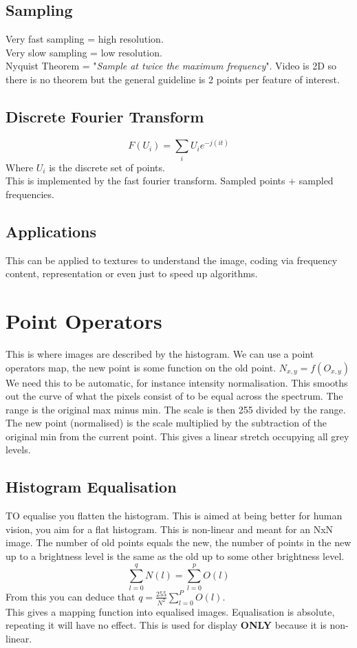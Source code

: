 \documentclass{article}
\begin{document}
	\subsection{Sampling}
	Very fast sampling = high resolution.\\
	Very slow sampling = low resolution.\\
	Nyquist Theorem = "\textit{Sample at twice the maximum frequency}". Video is 2D so there is no theorem but the general guideline is 2 points per feature of interest.
	\subsection{Discrete Fourier Transform}
	$$F(U_i)=\sum_{i}U_ie^{-j(it)}$$
	Where $U_i$ is the discrete set of points.\\
	This is implemented by the fast fourier transform. Sampled points + sampled frequencies.
	\subsection{Applications}
	This can be applied to textures to understand the image, coding via frequency content, representation or even just to speed up algorithms.
	\section{Point Operators}
	This is where images are described by the histogram. We can use a point operators map, the new point is some function on the old point. $N_{x,y}=f(O_{x,y})$\\
	We need this to be automatic, for instance intensity normalisation. This smooths out the curve of what the pixels consist of to be equal across the spectrum. The range is the original max minus min. The scale is then 255 divided by the range. The new point (normalised) is the scale multiplied by the subtraction of the original min from the current point. This gives a linear stretch occupying all grey levels.
	\subsection{Histogram Equalisation}
	TO equalise you flatten the histogram. This is aimed at being better for human vision, you aim for a flat histogram. This is non-linear and meant for an NxN image. The number of old points equals the new, the number of points in the new up to a brightness level is the same as the old up to some other brightness level.
	$$\sum_{l=0}^{q}N(l)=\sum_{l=0}^{p}O(l)$$
	From this you can deduce that $q=\frac{255}{N^2}\sum_{l=0}^{P}O(l)$.\\
	This gives a mapping function into equalised images. Equalisation is absolute, repeating it will have no effect. This is used for display \textbf{ONLY} because it is non-linear.
\end{document}
